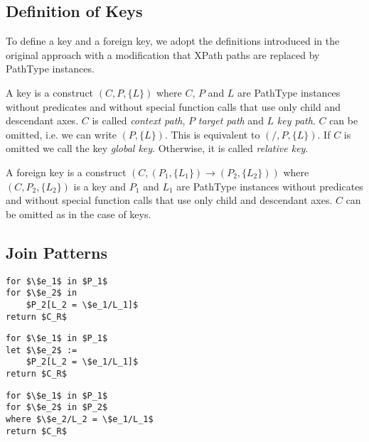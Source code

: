 \subsection{Definition of Keys}
To define a key and a foreign key, we adopt the definitions introduced in the original approach \cite{Necasky:2009:DXK:1529282.1529414} with a modification that XPath paths are replaced by PathType instances.

\begin{define}[Key]
A key is a construct $(C, P, \{L\})$ where $C$, $P$ and $L$ are PathType instances without predicates and without special function calls that use only child and descendant axes. $C$ is called \emph{context path}, $P$ \emph{target path} and $L$ \emph{key path}. $C$ can be omitted, i.e. we can write $(P, \{L\})$. This is equivalent to $(/, P, \{L\})$. If $C$ is omitted we call the key \emph{global key}. Otherwise, it is called \emph{relative key}.
\end{define}

\begin{define}
A foreign key is a construct $(C, (P_1, \{L_1\}) \rightarrow (P_2, \{L_2\}))$ where $(C, P_2, \{L_2\})$ is a key and $P_1$ and $L_1$ are PathType instances without predicates and without special function calls that use only child and descendant axes. $C$ can be omitted as in the case of keys.
\end{define}

\subsection{Join Patterns}

\begin{lstlisting}[mathescape, float, caption=Other form of the for join pattern., frame=single, label=listing_other_for_join_pattern]
for $\$e_1$ in $P_1$
for $\$e_2$ in
    $P_2[L_2 = \$e_1/L_1]$
return $C_R$
\end{lstlisting}

\begin{lstlisting}[mathescape, float, caption=Other form of the let join pattern., frame=single, label=listing_other_let_join_pattern]
for $\$e_1$ in $P_1$
let $\$e_2$ :=
    $P_2[L_2 = \$e_1/L_1]$
return $C_R$
\end{lstlisting}

\begin{lstlisting}[mathescape, float, caption=Join pattern 3., frame=single, label=listing_join_pattern_3]
for $\$e_1$ in $P_1$
for $\$e_2$ in $P_2$
where $\$e_2/L_2 = \$e_1/L_1$
return $C_R$
\end{lstlisting}

